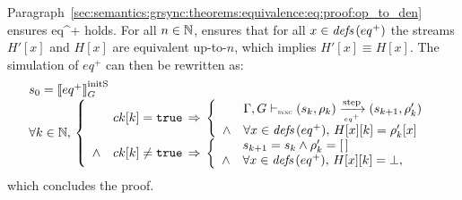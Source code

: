 \begin{skippableproof}
    Paragraph~\ref{sec:semantics:grsync:theorems:equivalence:eq:proof:op_to_den} ensures 
    {eq^+} holds. For all $n \in \mathbb{N}$,  ensures
    that for all $x \in {\ensuremath{\textit{defs}\left(eq^+\right)}}$ the streams $H'[x]$ and $H[x]$ are equivalent up-to-$n$, which
    implies $H'[x] \equiv H[x]$. The simulation of $eq^+$ can then be rewritten as:
    \begin{equation*}
        \begin{array}{l}
            s_0 = \initstate{eq^+} \\
            \forall k \in \N, \,
            \left\{
            \begin{array}{ll}
                       & ck[k] = \true \, \Rightarrow \,
                \left\{
                \begin{array}{ll}
                           & \eqOpsem{\rho_k}{s_k}{eq^+}{s_{k+1}}{\rho'_k}      \\
                    \wedge & \forall x \in \defs{eq^+}, \, H[x][k] = \rho'_k[x] \\
                \end{array}
                \right.                                     \\
                \wedge & ck[k] \neq \true \, \Rightarrow \,
                \left\{
                \begin{array}{ll}
                           & s_{k+1} = s_k \wedge \rho'_k = \emptyrho       \\
                    \wedge & \forall x \in \defs{eq^+}, \,  H[x][k] = \bot, \\
                \end{array}
                \right.                                     \\
            \end{array}
            \right.
        \end{array}
    \end{equation*}
    which concludes the proof.

    \setcounter{paragraph}{0}
    \setcounter{subparagraph}{0}
\end{skippableproof}

